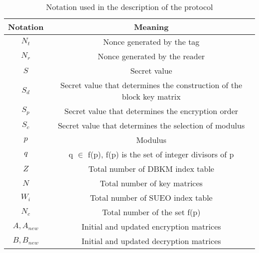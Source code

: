 \begin{table}[H]
    \centering
    \caption{Notation used in the description of the protocol}
    \begin{tabular}{| c | c |}
        \hline
        Notation & Meaning \\
        \hline
        $N_t$ & Nonce generated by the tag \\
        $N_r$ & Nonce generated by the reader \\
        $S$ & Secret value \\
        $S_d$ & Secret value that determines the construction of the block key matrix  \\
        $S_p$ & Secret value that determines the encryption order  \\
        $S_c$ & Secret value that determines the selection of modulus  \\
        $p$ & Modulus  \\
        $q$ & q $\in$ f(p), f(p) is the set of integer divisors of p \\
        $Z$ &  Total number of DBKM index table \\
        $N$ &  Total number of key matrices \\
        $W_i$ & Total number of SUEO index table  \\
        $N_c$ & Total number of the set f(p)  \\
        $A, A_{new}$ & Initial and updated encryption matrices \\
        $B, B_{new}$ & Initial and updated decryption matrices \\
        \hline
    \end{tabular}
\end{table}

